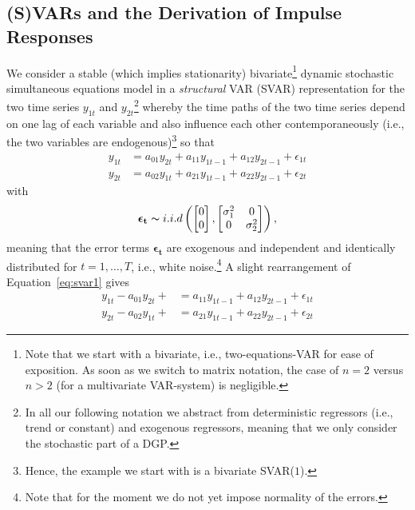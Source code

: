 \documentclass[a4paper,11pt,listof=nochaptergap,oneside,pointednumbers,bibtotoc,bigheadings,liststotoc]{scrbook}
\theoremstyle{mysatz}
\theoremstyle{mydefinition}
\theoremstyle{mytheorem}
\theoremstyle{mybemerkung}
\newcommand{\vect}[1]{\boldsymbol{\mathbf{#1}}}
\begin{document}
\subsection{(S)VARs and the Derivation of Impulse Responses}
We consider a stable (which implies stationarity) bivariate\footnote{Note that we start with a bivariate, i.e., two-equations-VAR for ease of exposition. As soon as we switch to matrix notation, the case of $n=2$ versus $n>2$ (for a multivariate VAR-system) is negligible.} dynamic stochastic simultaneous equations model in a \textit{structural} VAR (SVAR) representation for the two time series $y_{1t}$ and $y_{2t}$\footnote{In all our following notation we abstract from deterministic regressors (i.e., trend or constant) and exogenous regressors, meaning that we only consider the stochastic part of a DGP.} whereby the time paths of the two time series depend on one lag of each variable and also influence each other contemporaneously (i.e., the two variables are endogenous)\footnote{Hence, the example we start with is a bivariate SVAR($1$).} so that
\begin{equation} \label{eq:svar1}
\begin{split}
	y_{1t} & = a_{01}y_{2t} + a_{11}y_{1t-1} + a_{12}y_{2t-1} + \epsilon_{1t} \\
	y_{2t} & = a_{02}y_{1t} + a_{21}y_{1t-1} + a_{22}y_{2t-1} + \epsilon_{2t}
\end{split}								
\end{equation}
with 
\begin{equation}
\begin{split}
	\vect{\epsilon_t} \thicksim i.i.d \left (  \begin{bmatrix}
    							0 \\
    							0
 							 \end{bmatrix}, \begin{bmatrix}
    							\sigma_{1}^2 & 0  \\
    							0 & \sigma_{2}^2
 							 \end{bmatrix} \right ),
\end{split}								
\end{equation}
meaning that the error terms $\vect{\epsilon_t}$ are exogenous and independent and identically distributed  for $t = 1, \dots, T$, i.e., white noise.\footnote{Note that for the moment we do not yet impose normality of the errors.} A slight rearrangement of Equation~\ref{eq:svar1} gives 
\begin{equation} \label{eq:svar2}
\begin{split}
	y_{1t} - a_{01}y_{2t} + & = a_{11}y_{1t-1} + a_{12}y_{2t-1} + \epsilon_{1t} \\
	y_{2t} - a_{02}y_{1t} +  & = a_{21}y_{1t-1} + a_{22}y_{2t-1} + \epsilon_{2t}
\end{split}								
\end{equation}
\end{document}
